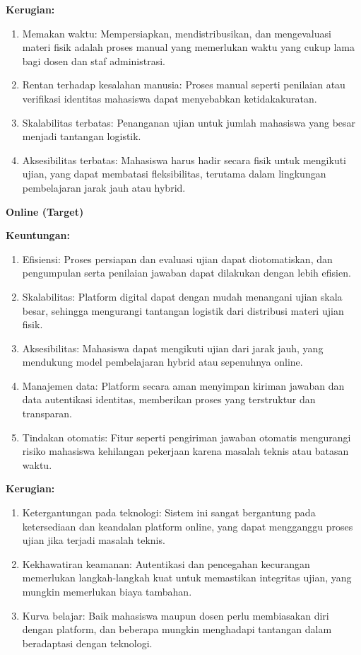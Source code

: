 \textbf{Kerugian:}
\begin{enumerate}
	\item Memakan waktu: Mempersiapkan, mendistribusikan, dan mengevaluasi materi fisik adalah proses manual yang memerlukan waktu yang cukup lama bagi dosen dan staf administrasi.
	\item Rentan terhadap kesalahan manusia: Proses manual seperti penilaian atau verifikasi identitas mahasiswa dapat menyebabkan ketidakakuratan.
	\item Skalabilitas terbatas: Penanganan ujian untuk jumlah mahasiswa yang besar menjadi tantangan logistik.
	\item Aksesibilitas terbatas: Mahasiswa harus hadir secara fisik untuk mengikuti ujian, yang dapat membatasi fleksibilitas, terutama dalam lingkungan pembelajaran jarak jauh atau hybrid.
\end{enumerate}

\textbf{Online (Target)}

\textbf{Keuntungan:}
\begin{enumerate}
	\item Efisiensi: Proses persiapan dan evaluasi ujian dapat diotomatiskan, dan pengumpulan serta penilaian jawaban dapat dilakukan dengan lebih efisien.
	\item Skalabilitas: Platform digital dapat dengan mudah menangani ujian skala besar, sehingga mengurangi tantangan logistik dari distribusi materi ujian fisik.
	\item Aksesibilitas: Mahasiswa dapat mengikuti ujian dari jarak jauh, yang mendukung model pembelajaran hybrid atau sepenuhnya online.
	\item Manajemen data: Platform secara aman menyimpan kiriman jawaban dan data autentikasi identitas, memberikan proses yang terstruktur dan transparan.
	\item Tindakan otomatis: Fitur seperti pengiriman jawaban otomatis mengurangi risiko mahasiswa kehilangan pekerjaan karena masalah teknis atau batasan waktu.
\end{enumerate}

\textbf{Kerugian:}
\begin{enumerate}
	\item Ketergantungan pada teknologi: Sistem ini sangat bergantung pada ketersediaan dan keandalan platform online, yang dapat mengganggu proses ujian jika terjadi masalah teknis.
	\item Kekhawatiran keamanan: Autentikasi dan pencegahan kecurangan memerlukan langkah-langkah kuat untuk memastikan integritas ujian, yang mungkin memerlukan biaya tambahan.
	\item Kurva belajar: Baik mahasiswa maupun dosen perlu membiasakan diri dengan platform, dan beberapa mungkin menghadapi tantangan dalam beradaptasi dengan teknologi.
\end{enumerate}

